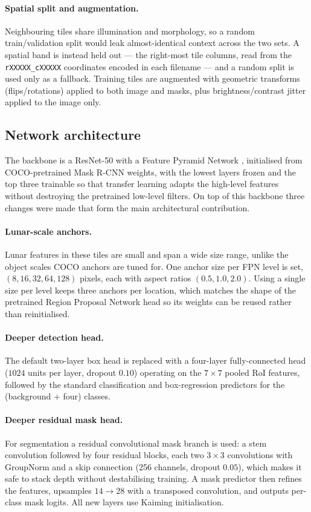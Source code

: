\documentclass{aa}
\begin{document}
\paragraph{Spatial split and augmentation.}
Neighbouring tiles share illumination and morphology, so a random train/validation
split would leak almost-identical context across the two sets. A spatial band is
instead held out --- the right-most tile columns, read from the \texttt{rXXXXX\_cXXXXX}
coordinates encoded in each filename --- and a random split is used only as a fallback.
Training tiles are augmented with geometric transforms (flips/rotations) applied to
both image and masks, plus brightness/contrast jitter applied to the image only.

\subsection{Network architecture}
\label{sec:method}
The backbone is a ResNet-50 with a Feature Pyramid Network
\citep{he2016resnet,lin2017fpn}, initialised from COCO-pretrained Mask R-CNN
weights, with the lowest layers frozen and the top three trainable so that
transfer learning adapts the high-level features without destroying the
pretrained low-level filters. On top of this backbone three changes were made that
form the main architectural contribution.

\paragraph{Lunar-scale anchors.}
Lunar features in these tiles are small and span a wide size range, unlike the
object scales COCO anchors are tuned for. One anchor size per FPN level is set,
$(8,16,32,64,128)$ pixels, each with aspect ratios $(0.5, 1.0, 2.0)$. Using a
single size per level keeps three anchors per location, which matches the shape of
the pretrained Region Proposal Network head so its weights can be reused rather
than reinitialised.

\paragraph{Deeper detection head.}
The default two-layer box head is replaced with a four-layer fully-connected head
($1024$ units per layer, dropout $0.10$) operating on the $7\times7$ pooled RoI
features, followed by the standard classification and box-regression predictors for
the (background $+$ four) classes.

\paragraph{Deeper residual mask head.}
For segmentation a residual convolutional mask branch is used: a stem convolution
followed by four residual blocks, each two $3\times3$ convolutions with GroupNorm
and a skip connection (256 channels, dropout $0.05$), which makes it safe to stack
depth without destabilising training. A mask predictor then refines the features,
upsamples $14\rightarrow28$ with a transposed convolution, and outputs per-class
mask logits. All new layers use Kaiming initialisation.
\end{document}
